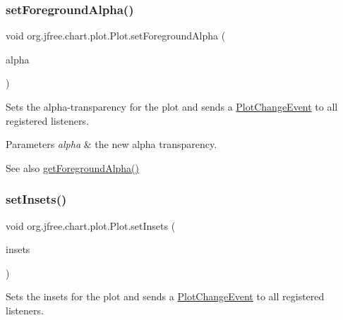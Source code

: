 \subsubsection{\texorpdfstring{set\+Foreground\+Alpha()}{setForegroundAlpha()}}
{\footnotesize\ttfamily void org.\+jfree.\+chart.\+plot.\+Plot.\+set\+Foreground\+Alpha (\begin{DoxyParamCaption}\item[{float}]{alpha }\end{DoxyParamCaption})}

Sets the alpha-\/transparency for the plot and sends a \mbox{\hyperlink{}{Plot\+Change\+Event}} to all registered listeners.


\begin{DoxyParams}{Parameters}
{\em alpha} & the new alpha transparency.\\
\hline
\end{DoxyParams}
\begin{DoxySeeAlso}{See also}
\mbox{\hyperlink{classorg_1_1jfree_1_1chart_1_1plot_1_1_plot_a1ce9b4391819a9e5ff7e50d16c649fdd}{get\+Foreground\+Alpha()}} 
\end{DoxySeeAlso}
\mbox{\label{classorg_1_1jfree_1_1chart_1_1plot_1_1_plot_a53965b8c7aa0ea6215a2f37447112ba5}} 
\subsubsection{\texorpdfstring{set\+Insets()}{setInsets()}\hspace{0.1cm}{\footnotesize\ttfamily [1/2]}}
{\footnotesize\ttfamily void org.\+jfree.\+chart.\+plot.\+Plot.\+set\+Insets (\begin{DoxyParamCaption}\item[{Rectangle\+Insets}]{insets }\end{DoxyParamCaption})}

Sets the insets for the plot and sends a \mbox{\hyperlink{}{Plot\+Change\+Event}} to all registered listeners.



